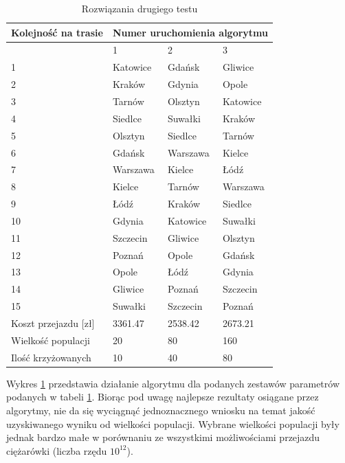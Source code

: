 \documentclass[12pt, oneside, final]{report}
\begin{document}
\begin{table}[ht!]
\caption{Rozwiązania drugiego testu}
\label{tab:results-diff-population}
\centering
\begin{tabular}{llll}
\hline 
Kolejność na trasie & \multicolumn{3}{c}{Numer uruchomienia algorytmu}\\
\hline
						& 1 & 2 & 3\\
\hline
1 						& Katowice	& Gdańsk	& Gliwice\\
2						& Kraków	& Gdynia	& Opole\\
3						& Tarnów	& Olsztyn	& Katowice\\
4						& Siedlce	& Suwałki	& Kraków\\
5						& Olsztyn	& Siedlce	& Tarnów\\
6						& Gdańsk	& Warszawa	& Kielce\\
7						& Warszawa	& Kielce	& Łódź\\
8						& Kielce	& Tarnów	& Warszawa\\
9						& Łódź		& Kraków		& Siedlce\\
10						& Gdynia	& Katowice	& Suwałki\\
11						& Szczecin	& Gliwice		& Olsztyn\\
12						& Poznań	& Opole	& Gdańsk\\
13						& Opole		& Łódź		& Gdynia\\
14						& Gliwice	& Poznań	& Szczecin\\
15						& Suwałki	& Szczecin	& Poznań\\
\hline
Koszt przejazdu [zł]	& 3361.47	& 2538.42 	& 2673.21\\
\hline
Wielkość populacji		& 20		& 80 	& 160\\
\hline
Ilość krzyżowanych		& 10		& 40 	& 80\\
\hline

\end{tabular}
\end{table}

Wykres \ref{tab:results-diff-population} przedstawia działanie algorytmu dla podanych zestawów parametrów podanych w tabeli \ref{tab:results-diff-population}. Biorąc pod uwagę najlepsze rezultaty osiągane przez algorytmy, nie da się wyciągnąć jednoznacznego wniosku na temat jakość uzyskiwanego wyniku od wielkości populacji. Wybrane wielkości populacji były jednak bardzo małe w porównaniu ze wszystkimi możliwościami przejazdu ciężarówki (liczba rzędu $10^{12}$).
\end{document}

